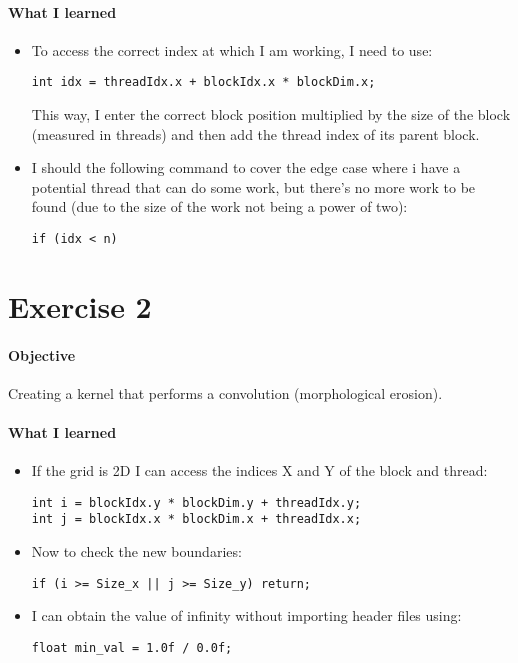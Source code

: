\documentclass{article}
\begin{document}
\paragraph{What I learned}
\begin{itemize}
  \item To access the correct index at which I am working, I need to use:
  \begin{lstlisting}[caption=Index access]
int idx = threadIdx.x + blockIdx.x * blockDim.x;
  \end{lstlisting}
  This way, I enter the correct block position multiplied by the size of the block (measured in threads) and then add the thread index of its parent block.
  \item  I should the following command to cover the edge case where i have a potential thread that can do some work, but there's no more work to be found (due to the size of the work not being a power of two):
  \begin{lstlisting}[caption=Index edge-case]
if (idx < n)
  \end{lstlisting}
\end{itemize}

\newpage
\section{Exercise 2}
\paragraph{Objective}
Creating a kernel that performs a convolution (morphological erosion).
\paragraph{What I learned}
  
\begin{itemize}
  \item If the grid is 2D I can access the indices X and Y of the block and thread:
    \begin{lstlisting}[caption=Index access]
int i = blockIdx.y * blockDim.y + threadIdx.y;
int j = blockIdx.x * blockDim.x + threadIdx.x;
    \end{lstlisting}
  \item Now to check the new boundaries:
    \begin{lstlisting}[caption=Index edge-case]
if (i >= Size_x || j >= Size_y) return;
    \end{lstlisting}
    \item I can obtain the value of infinity without importing header files using:
    \begin{lstlisting}[caption=Infinity]
float min_val = 1.0f / 0.0f;
    \end{lstlisting}
\end{itemize}
\end{document}
